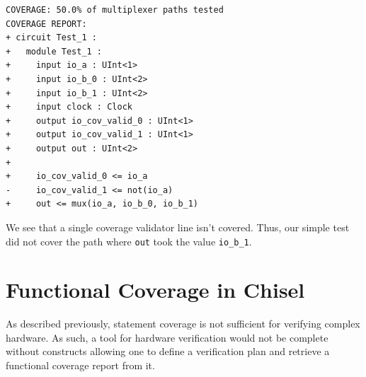 \documentclass[conference]{IEEEtran}
\newcommand{\martin}[1]{{\color{blue} Martin: #1}}
\begin{document}
\begin{verbatim}
COVERAGE: 50.0% of multiplexer paths tested
COVERAGE REPORT:
+ circuit Test_1 :
+   module Test_1 :
+     input io_a : UInt<1>
+     input io_b_0 : UInt<2>
+     input io_b_1 : UInt<2>
+     input clock : Clock
+     output io_cov_valid_0 : UInt<1>
+     output io_cov_valid_1 : UInt<1>
+     output out : UInt<2>
+   
+     io_cov_valid_0 <= io_a
-     io_cov_valid_1 <= not(io_a)
+     out <= mux(io_a, io_b_0, io_b_1)
\end{verbatim}
We see that a single coverage validator line isn't covered. Thus, our simple test did not cover the path where \texttt{out} took the value \texttt{io\_b\_1}.



\section{Functional Coverage in Chisel}
As described previously, statement coverage is not sufficient for verifying complex hardware. As such, a tool for hardware verification would not be complete without constructs allowing one to define a verification plan and retrieve a functional coverage report from it. %
\end{document}
